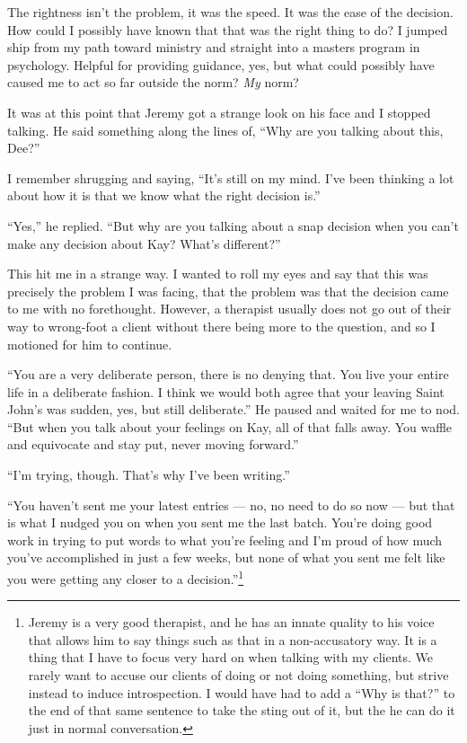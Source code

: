 The rightness isn't the problem, it was the speed. It was the ease of the decision. How could I possibly have known that that was the right thing to do? I jumped ship from my path toward ministry and straight into a masters program in psychology. Helpful for providing guidance, yes, but what could possibly have caused me to act so far outside the norm? \emph{My} norm?

It was at this point that Jeremy got a strange look on his face and I stopped talking. He said something along the lines of, ``Why are you talking about this, Dee?''

I remember shrugging and saying, ``It's still on my mind. I've been thinking a lot about how it is that we know what the right decision is.''

``Yes,'' he replied. ``But why are you talking about a snap decision when you can't make any decision about Kay? What's different?''

This hit me in a strange way. I wanted to roll my eyes and say that this was precisely the problem I was facing, that the problem was that the decision came to me with no forethought. However, a therapist usually does not go out of their way to wrong-foot a client without there being more to the question, and so I motioned for him to continue.

``You are a very deliberate person, there is no denying that. You live your entire life in a deliberate fashion. I think we would both agree that your leaving Saint John's was sudden, yes, but still deliberate.'' He paused and waited for me to nod. ``But when you talk about your feelings on Kay, all of that falls away. You waffle and equivocate and stay put, never moving forward.''

``I'm trying, though. That's why I've been writing.''

``You haven't sent me your latest entries --- no, no need to do so now --- but that is what I nudged you on when you sent me the last batch. You're doing good work in trying to put words to what you're feeling and I'm proud of how much you've accomplished in just a few weeks, but none of what you sent me felt like you were getting any closer to a decision.''\footnote{Jeremy is a very good therapist, and he has an innate quality to his voice that allows him to say things such as that in a non-accusatory way. It is a thing that I have to focus very hard on when talking with my clients. We rarely want to accuse our clients of doing or not doing something, but strive instead to induce introspection. I would have had to add a ``Why is that?'' to the end of that same sentence to take the sting out of it, but the he can do it just in normal conversation.}

